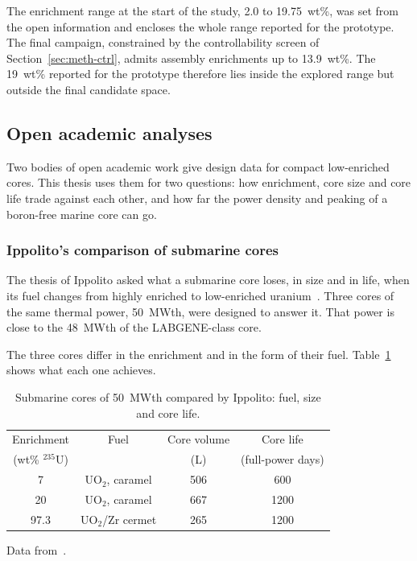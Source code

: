 The enrichment range at the start of the study, 2.0 to 19.75~wt\%, was
set from the open information and encloses the whole range reported for
the prototype. The
final campaign, constrained by the controllability screen of
Section~\ref{sec:meth-ctrl}, admits assembly enrichments up to
13.9~wt\%. The 19~wt\% reported for the prototype therefore lies inside
the explored range but outside the final candidate space.

\subsection{Open academic analyses}
\label{subsec:naval-academic}

Two bodies of open academic work give design data for compact
low-enriched cores. This thesis uses them for two questions: how
enrichment, core size and core life trade against each other, and how
far the power density and peaking of a boron-free marine core can go.

\subsubsection{Ippolito's comparison of submarine cores}
\label{subsec:academic-ippolito}

The thesis of Ippolito asked what a submarine core loses, in size and
in life, when its fuel changes from highly enriched to low-enriched
uranium~\cite{ippolito_1990}. Three cores of the same thermal power,
50~MWth, were designed to answer it. That power is close to the
48~MWth of the LABGENE-class core.

The three cores differ in the enrichment and in the form of their fuel.
Table~\ref{tab:lr-ippolito} shows what each one achieves.

\begin{table}[!htbp]
  \centering
  \caption{Submarine cores of 50~MWth compared by Ippolito: fuel, size and core life.}
  \label{tab:lr-ippolito}
  \small
  \begin{tabular}{@{}cccc@{}}
    \toprule
    Enrichment & Fuel & Core volume & Core life \\
    (wt\% $^{235}$U) & & (L) & (full-power days) \\
    \midrule
    7    & UO$_2$, caramel   & 506 & 600  \\
    20   & UO$_2$, caramel   & 667 & 1200 \\
    97.3 & UO$_2$/Zr cermet  & 265 & 1200 \\
    \bottomrule
  \end{tabular}

  \vspace{2pt}
  {\footnotesize Data from~\cite{ippolito_1990}.}
\end{table}
\FloatBarrier

